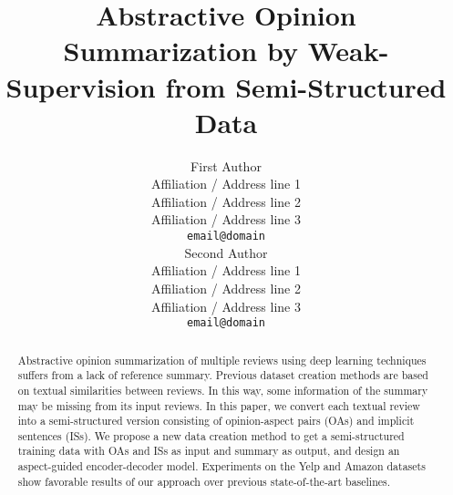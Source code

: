 \documentclass[11pt]{article}
\title{Abstractive Opinion Summarization by Weak-Supervision from
Semi-Structured Data}
\author{First Author \\
  Affiliation / Address line 1 \\
  Affiliation / Address line 2 \\
  Affiliation / Address line 3 \\
  \texttt{email@domain} \\\And
  Second Author \\
  Affiliation / Address line 1 \\
  Affiliation / Address line 2 \\
  Affiliation / Address line 3 \\
  \texttt{email@domain} \\}
\date{}
\newcommand{\cut}[1]{}
\newcommand{\KZ}[1]{\textcolor{blue}{Kenny: #1}}
\begin{document}
\maketitle

\begin{abstract}
Abstractive opinion summarization of multiple reviews
 using deep learning techniques suffers from a lack 
of reference summary.
Previous dataset creation methods are based on
textual similarities between reviews.
In this way,
some information of the summary may be missing from its input reviews.
In this paper, 
we convert each textual review into a semi-structured
version consisting of 
opinion-aspect pairs (OAs) and implicit sentences (ISs).
We propose a new data creation method to get a semi-structured training data 
with OAs and ISs as input and summary as output,
and design an aspect-guided 
encoder-decoder model.
Experiments on the Yelp and Amazon datasets show 
favorable results of our approach over
previous state-of-the-art baselines.
\cut{%
we present a semi-structured review that consists of
opinion-aspect pairs extracted from the review
and sentences without opinion-aspect pairs.
We create the synthetic training data 
by sampling a review as summary and
generating the noisy version of semi-structured summary 
as semi-structured multiple reviews. 
We introduce variant aspect guided summarization models
for producing summaries from semi-structured multiple reviews.
}
\end{abstract}
\end{document}
